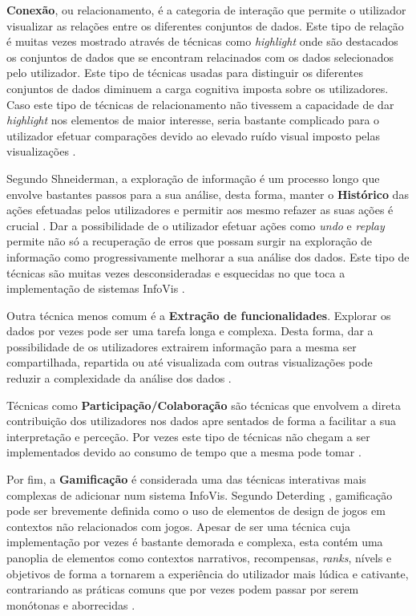 \textbf{Conexão}, ou relacionamento, é a categoria de interação que permite o utilizador visualizar as relações entre os diferentes conjuntos de dados. Este tipo de relação é muitas vezes mostrado através de técnicas como \textit{highlight} onde são destacados os conjuntos de dados que se encontram relacinados com os dados selecionados pelo utilizador. Este tipo de técnicas usadas para distinguir os diferentes conjuntos de dados diminuem a carga cognitiva imposta sobre os utilizadores. Caso este tipo de técnicas de relacionamento não tivessem a capacidade de dar \textit{highlight} nos elementos de maior interesse, seria bastante complicado para o utilizador efetuar comparações devido ao elevado ruído visual imposto pelas visualizações \cite{figueiras2015towards}.

Segundo Shneiderman, a exploração de informação é um processo longo que envolve bastantes passos para a sua análise, desta forma, manter o \textbf{Histórico} das ações efetuadas pelos utilizadores e permitir aos mesmo refazer as suas ações é crucial \cite{heer2012interactive}. Dar a possibilidade de o utilizador efetuar ações como \textit{undo} e \textit{replay} permite não só a recuperação de erros que possam surgir na exploração de informação como progressivamente melhorar a sua análise dos dados. Este tipo de técnicas são muitas vezes desconsideradas e esquecidas no que toca a implementação de sistemas \gls{InfoVis} \cite{figueiras2015towards}. 

Outra técnica menos comum é a \textbf{Extração de funcionalidades}. Explorar os dados por vezes pode ser uma tarefa longa e complexa. Desta forma, dar a possibilidade de os utilizadores extrairem informação para a mesma ser compartilhada, repartida ou até visualizada com outras visualizações pode reduzir a complexidade da análise dos dados \cite{figueiras2015towards, heer2012interactive}.

Técnicas como \textbf{Participação/Colaboração} são técnicas que envolvem a direta contribuição dos utilizadores nos dados apre sentados de forma a facilitar a sua interpretação e perceção. Por vezes este tipo de técnicas não chegam a ser implementados devido ao consumo de tempo que a mesma pode tomar \cite{figueiras2015towards}. 

Por fim, a \textbf{Gamificação} é considerada uma das técnicas interativas mais complexas de adicionar num sistema \gls{InfoVis}. Segundo Deterding \cite{deterding2011game}, gamificação pode ser brevemente definida como o uso de elementos de design de jogos em contextos não relacionados com jogos. Apesar de ser uma técnica cuja implementação por vezes é bastante demorada e complexa, esta contém uma panoplia de elementos como contextos narrativos, recompensas, \textit{ranks}, nívels e objetivos de forma a tornarem a experiência do utilizador mais lúdica e cativante, contrariando as práticas comuns que por vezes podem passar por serem monótonas e aborrecidas \cite{figueiras2015towards}.

